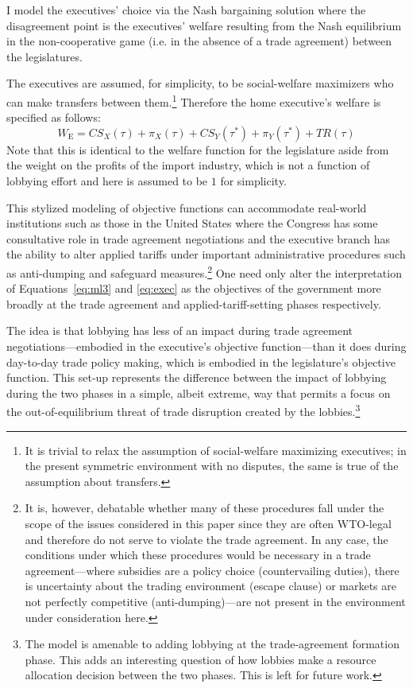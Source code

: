 \documentclass[authoryear, review]{elsarticle}
\begin{document}
I model the executives' choice via the Nash bargaining solution where the disagreement point is the executives' welfare resulting from the Nash equilibrium in the non-cooperative game (i.e. in the absence of a trade agreement) between the legislatures.

The executives are assumed, for simplicity, to be social-welfare maximizers who can make transfers between them.\footnote{It is trivial to relax the assumption of social-welfare maximizing executives; in the present symmetric environment with no disputes, the same is true of the assumption about transfers.} Therefore the home executive's welfare is specified as follows:
\begin{equation}
  W_\text{E} = \mathit{CS}_X(\tau) + \pi_X(\tau) + \mathit{CS}_Y(\tau^*) + \pi_Y(\tau^*) + \mathit{TR}(\tau)
	\label{eq:exec}
\end{equation}
Note that this is identical to the welfare function for the legislature aside from the weight on the profits of the import industry, which is not a function of lobbying effort and here is assumed to be $1$ for simplicity. 

This stylized modeling of objective functions can accommodate real-world institutions such as those in the United States where the Congress has some consultative role in trade agreement negotiations and the executive branch has the ability to alter applied tariffs under important administrative procedures such as anti-dumping and safeguard measures.\footnote{It is, however, debatable whether many of these procedures fall under the scope of the issues considered in this paper since they are often WTO-legal and therefore do not serve to violate the trade agreement. In any case, the conditions under which these procedures would be necessary in a trade agreement---where subsidies are a policy choice (countervailing duties), there is uncertainty about the trading environment (escape clause) or markets are not perfectly competitive (anti-dumping)---are not present in the environment under consideration here.} One need only alter the interpretation of Equations~\ref{eq:ml3} and \ref{eq:exec} as the objectives of the government more broadly at the trade agreement and applied-tariff-setting phases respectively.

The idea is that lobbying has less of an impact during trade agreement negotiations---embodied in the executive's objective function---than it does during day-to-day trade policy making, which is embodied in the legislature's objective function. This set-up represents the difference between the impact of lobbying during the two phases in a simple, albeit extreme, way that permits a focus on the out-of-equilibrium threat of trade disruption created by the lobbies.\footnote{The model is amenable to adding lobbying at the trade-agreement formation phase. This adds an interesting question of how lobbies make a resource allocation decision between the two phases. This is left for future work.} 
\end{document}
